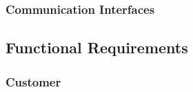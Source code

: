 
\subsubsection{Communication Interfaces}



\subsection{Functional Requirements}



\subsubsection{Customer}

